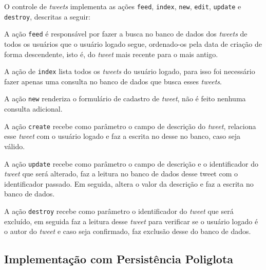 O controle de \textit{tweets} implementa as ações \verb|feed|, \verb|index|, \verb|new|, \verb|edit|, \verb|update| e \verb|destroy|, descritas a seguir:

A ação \verb|feed| é responsável por fazer a busca no banco de dados dos \textit{tweets} de todos os usuários que o usuário logado segue, ordenado-os pela data de criação de forma descendente, isto é, do \textit{tweet} mais recente para o mais antigo.

A ação de \verb|index| lista todos os \textit{tweets} do usuário logado, para isso foi necessário fazer apenas uma consulta no banco de dados que busca esses \textit{tweets}.

A ação \verb|new| renderiza o formulário de cadastro de \textit{tweet}, não é feito nenhuma consulta adicional.

A ação \verb|create| recebe como parâmetro o campo de descrição do \textit{tweet}, relaciona esse \textit{tweet} com o usuário logado e faz a escrita no desse no banco, caso seja válido.

A ação \verb|update| recebe como parâmetro o campo de descrição e o identificador do \textit{tweet} que será alterado, faz a leitura no banco de dados desse tweet com o identificador passado. Em seguida, altera o valor da descrição e faz a escrita no banco de dados.

A ação \verb|destroy| recebe como parâmetro o identificador do \textit{tweet} que será excluído, em seguida faz a leitura desse \textit{tweet} para verificar se o usuário logado é o autor do \textit{tweet} e caso seja confirmado, faz exclusão desse do banco de dados.


\subsection{Implementação com Persistência Poliglota}
\label{subsec:polyglot}

